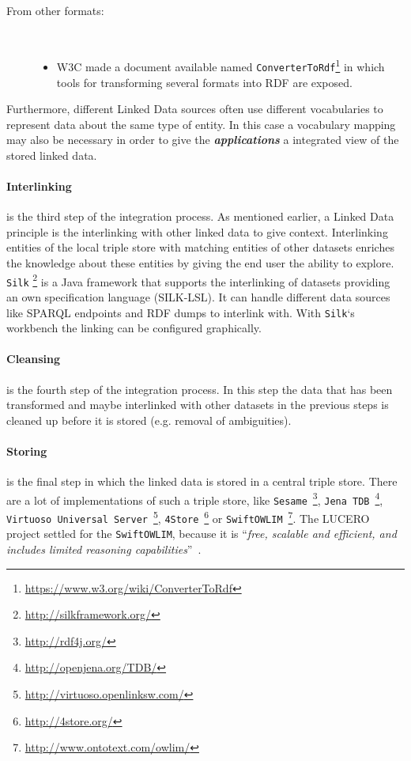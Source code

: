\documentclass{article}
\begin{document}
\begin{description}
\begin{itemize}
	\end{itemize}
	\item[\small From other formats:] $ $
	\begin{itemize}
		\item W3C made a document available named \texttt{ConverterToRdf}\footnote{\url{https://www.w3.org/wiki/ConverterToRdf}} in which tools for transforming several formats into RDF are exposed.
	\end{itemize}
\end{description}

Furthermore, different Linked Data sources often use different vocabularies to represent data about the same type of entity.\cite{berners-lee_fractal_2008} In this case a vocabulary mapping may also be necessary in order to give the \textit{\textbf{applications}} a integrated view of the stored linked data. 

\paragraph{Interlinking} is the third step of the integration process. As mentioned earlier, a Linked Data principle is the interlinking with other linked data to give context. Interlinking entities of the local triple store with matching entities of other datasets enriches the knowledge about these entities by giving the end user the ability to explore. \texttt{Silk} \footnote{\url{http://silkframework.org/}} is a Java framework that supports the interlinking of datasets providing an own specification language (SILK-LSL). It can handle different data sources like SPARQL endpoints and RDF dumps to interlink with. With \texttt{Silk}`s workbench the linking can be configured graphically.

\paragraph{Cleansing} is the fourth step of the integration process. In this step the data that has been transformed and maybe interlinked with other datasets in the previous steps is cleaned up before it is stored (e.g. removal of ambiguities).

\paragraph{Storing} is the final step in which the linked data is stored in a central triple store. There are a lot of implementations of such a triple store, like 
\texttt{Sesame}~\footnote{\url{http://rdf4j.org/}}, 
\texttt{Jena TDB}~\footnote{\url{http://openjena.org/TDB/}},
\texttt{Virtuoso Universal Server}~\footnote{\url{http://virtuoso.openlinksw.com/}},
\texttt{4Store}~\footnote{\url{http://4store.org/}} or 
\texttt{SwiftOWLIM}~\footnote{\url{http://www.ontotext.com/owlim/}}. The LUCERO project settled for the \texttt{SwiftOWLIM}, because it is ``\textit{free, scalable and efficient, and includes limited reasoning capabilities}''~\cite{daquin_lucero_2010-1}.
\end{document}
